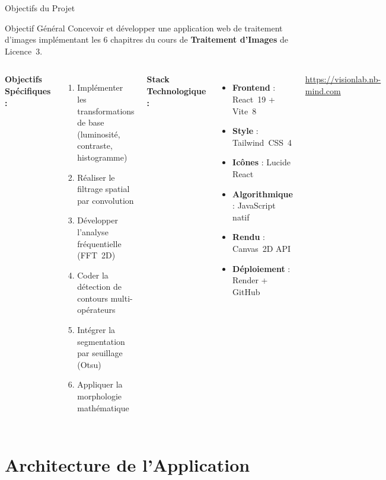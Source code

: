 \documentclass[aspectratio=169, 11pt]{beamer}
\begin{document}
\begin{frame}{Objectifs du Projet}
  \begin{exampleblock}{Objectif Général}
    Concevoir et développer une application web de traitement d'images implémentant les 6 chapitres du cours de \textbf{Traitement d'Images} de Licence~3.
  \end{exampleblock}
  \vspace{8pt}
  \begin{columns}[T]
    \textbf{\textcolor{uy1blue}{Objectifs Spécifiques :}}
    \begin{enumerate}
      \item Implémenter les transformations de base (luminosité, contraste, histogramme)
      \item Réaliser le filtrage spatial par convolution
      \item Développer l'analyse fréquentielle (FFT~2D)
      \item Coder la détection de contours multi-opérateurs
      \item Intégrer la segmentation par seuillage (Otsu)
      \item Appliquer la morphologie mathématique
    \end{enumerate}

    \textbf{\textcolor{uy1purple}{Stack Technologique :}}
    \begin{itemize}
      \item \textbf{Frontend} : React~19 + Vite~8
      \item \textbf{Style} : Tailwind~CSS~4
      \item \textbf{Icônes} : Lucide React
      \item \textbf{Algorithmique} : JavaScript natif
      \item \textbf{Rendu} : Canvas~2D API
      \item \textbf{Déploiement} : Render + GitHub
    \end{itemize}
    \vspace{6pt}
    \begin{center}
      \footnotesize\textcolor{gray}{\url{https://visionlab.nb-mind.com}}
    \end{center}
  \end{columns}
\end{frame}

\section{Architecture de l'Application}
\end{document}
